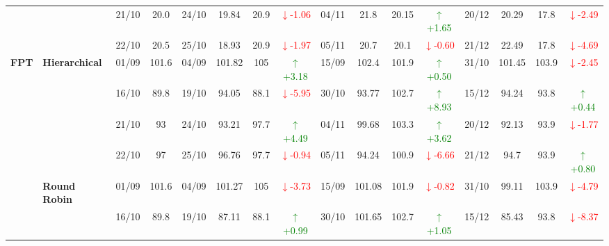 {\begin{longtable}{llcc|cccc|cccc|cccc}
&
& 21/10 & 20.0 & 24/10 & 19.84 & 20.9 & \textcolor{red}{\(\downarrow\)-1.06} & 04/11 & 21.8 & 20.15 & \textcolor{green}{\(\uparrow\)+1.65} & 20/12 & 20.29 & 17.8 & \textcolor{red}{\(\downarrow\)-2.49} \\

&
& 22/10 & 20.5 & 25/10 & 18.93 & 20.9 & \textcolor{red}{\(\downarrow\)-1.97} & 05/11 & 20.7 & 20.1 & \textcolor{red}{\(\downarrow\)-0.60} & 21/12 & 22.49 & 17.8 & \textcolor{red}{\(\downarrow\)-4.69} \\
\midrule



\multirow{12}{*}{\textbf{FPT}} 
& \textbf{Hierarchical}
& 01/09 & 101.6 & 04/09 & 101.82 & 105 & \textcolor{green}{\(\uparrow\)+3.18} & 15/09 & 102.4 & 101.9 & \textcolor{green}{\(\uparrow\)+0.50} & 31/10 & 101.45 & 103.9 & \textcolor{red}{\(\downarrow\)-2.45} \\

&
& 16/10 & 89.8 & 19/10 & 94.05 & 88.1 & \textcolor{red}{\(\downarrow\)-5.95} & 30/10 & 93.77 & 102.7 & \textcolor{green}{\(\uparrow\)+8.93} & 15/12 & 94.24 & 93.8 & \textcolor{green}{\(\uparrow\)+0.44} \\

&
& 21/10 & 93 & 24/10 & 93.21 & 97.7 & \textcolor{green}{\(\uparrow\)+4.49} & 04/11 & 99.68 & 103.3 & \textcolor{green}{\(\uparrow\)+3.62} & 20/12 & 92.13 & 93.9 & \textcolor{red}{\(\downarrow\)-1.77} \\

&
& 22/10 & 97 & 25/10 & 96.76 & 97.7 & \textcolor{red}{\(\downarrow\)-0.94} & 05/11 & 94.24 & 100.9 & \textcolor{red}{\(\downarrow\)-6.66} & 21/12 & 94.7 & 93.9 & \textcolor{green}{\(\uparrow\)+0.80} \\
\cmidrule(lr){2-16}


& \textbf{Round Robin}
& 01/09 & 101.6 & 04/09 & 101.27 & 105 & \textcolor{red}{\(\downarrow\)-3.73} & 15/09 & 101.08 & 101.9 & \textcolor{red}{\(\downarrow\)-0.82} & 31/10 & 99.11 & 103.9 & \textcolor{red}{\(\downarrow\)-4.79} \\

&
& 16/10 & 89.8 & 19/10 & 87.11 & 88.1 & \textcolor{green}{\(\uparrow\)+0.99} & 30/10 & 101.65 & 102.7 & \textcolor{green}{\(\uparrow\)+1.05} & 15/12 & 85.43 & 93.8 & \textcolor{red}{\(\downarrow\)-8.37} \\


\end{longtable}}
